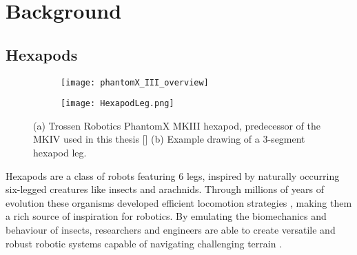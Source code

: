 \chapter{Background}
\label{ch:background}


\section{Hexapods} \label{sec: Hexapods}

\begin{figure}[!h]
	\begin{subfigure}{.5\textwidth} %
		\centering
		\texttt{[image: phantomX\_III\_overview]}  %
		\caption{}
		\label{figure: PhantomX MKIII}
	\end{subfigure}
	\begin{subfigure}{.5\textwidth}
		\centering
		\texttt{[image: HexapodLeg.png]}  
		\caption{}
		\label{figure: Hexapod Leg Sketch}
	\end{subfigure}
	\caption[Hexapod and hexapod leg]{(a) Trossen Robotics PhantomX MKIII hexapod, predecessor of the MKIV used in this thesis [\cite{PhantomX_MKIII}] (b) Example drawing of a 3-segment hexapod leg.}
	\label{figure: Hexapod and hexapod leg}
\end{figure}

Hexapods are a class of robots featuring 6 legs, inspired by naturally occurring six-legged creatures like insects and arachnids.
Through millions of years of evolution these organisms developed efficient locomotion strategies \parencite{neville2006bipedal}, making them a rich source of inspiration for robotics.
By emulating the biomechanics and behaviour of insects, researchers and engineers are able to create versatile and robust robotic systems capable of navigating challenging terrain \parencite{irawan2011optimal, ouyang2021adaptive, schilling2013walknet}.

